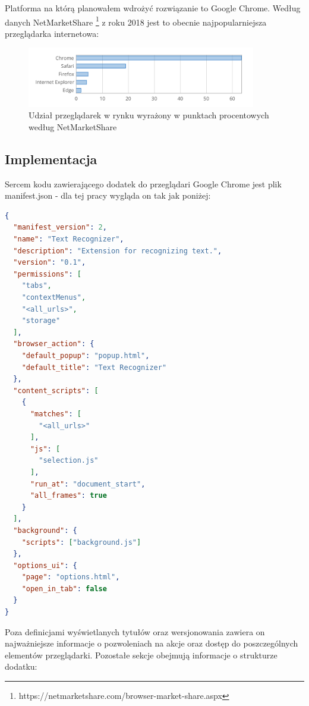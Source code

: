 Platforma na którą planowałem wdrożyć rozwiązanie to Google Chrome. Według danych NetMarketShare \footnote{https://netmarketshare.com/browser-market-share.aspx} z roku 2018 jest to obecnie najpopularniejsza przeglądarka internetowa:

\begin{figure}[H]
    \centering
    \includegraphics[width=10cm]{browser_market_share.png}
    \caption{Udział przeglądarek w rynku wyrażony w punktach procentowych według NetMarketShare }
\end{figure}

\subsection{Implementacja}

Sercem kodu zawierającego dodatek do przeglądari Google Chrome jest plik manifest.json - dla tej pracy wygląda on tak jak poniżej:

\begin{lstlisting}[language=json]
{
  "manifest_version": 2,
  "name": "Text Recognizer",
  "description": "Extension for recognizing text.",
  "version": "0.1",
  "permissions": [
    "tabs",
    "contextMenus",
    "<all_urls>",
    "storage"
  ],
  "browser_action": {
    "default_popup": "popup.html",
    "default_title": "Text Recognizer"
  },
  "content_scripts": [
    {
      "matches": [
        "<all_urls>"
      ],
      "js": [
        "selection.js"
      ],
      "run_at": "document_start",
      "all_frames": true
    }
  ],
  "background": {
    "scripts": ["background.js"]
  },
  "options_ui": {
    "page": "options.html",
    "open_in_tab": false
  }
}
\end{lstlisting}

Poza definicjami wyświetlanych tytułów oraz wersjonowania zawiera on najważniejsze informacje o pozwoleniach na akcje oraz dostęp do poszczególnych elementów przeglądarki. Pozostałe sekcje obejmują informacje o strukturze dodatku: 

